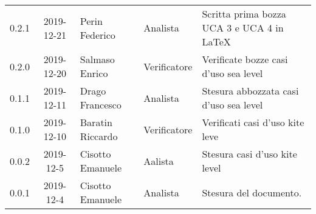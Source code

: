{\begin{longtable}{ c c  C{4cm}  C{3cm} C{4cm}}
0.2.1 & 2019-12-21 & Perin Federico & Analista & Scritta prima bozza UCA 3 e UCA 4 in LaTeX\\

0.2.0 & 2019-12-20 & Salmaso Enrico & Verificatore & Verificate bozze casi d'uso sea level\\

0.1.1 & 2019-12-11 & Drago Francesco & Analista & Stesura abbozzata casi d'uso sea level\\

0.1.0 & 2019-12-10 & Baratin Riccardo & Verificatore & Verificati casi d'uso kite leve\\

0.0.2 & 2019-12-5 & Cisotto Emanuele & Aalista & Stesura casi d'uso kite level\\

0.0.1 & 2019-12-4 & Cisotto Emanuele & Analista & Stesura del documento.  \\		
		
\end{longtable}
}